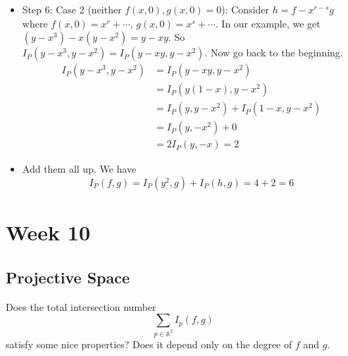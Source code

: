 \documentclass{report}
\begin{document}
\begin{examples}
\begin{example}
\begin{itemize}
                \item Step 6: Case 2 (neither $f(x, 0), g(x, 0) = 0$): Consider $h = f - x^{r - s}g$ where $f(x, 0) = x^{r} + \cdots $, $g(x, 0) = x^{s} + \cdots$. In our example, we get $(y - x^{3}) - x(y - x^{2}) = y - xy$. So $I_{P}(y - x^{3}, y - x^{2}) = I_{P}(y - xy, y - x^{2})$. Now go back to the beginning.
                    \begin{align*}
                        I_{P}(y - x^{3}, y - x^{2}) &= I_{P}(y - xy, y - x^{2})                      \\
                                                    &= I_{P}(y(1 - x), y - x^{2})                    \\
                                                    &= I_{P}(y, y - x^{2}) + I_{P}(1 - x, y - x^{2}) \\
                                                    &= I_{P}(y, -x^{2}) + 0                          \\
                                                    &=  2I_{P}(y, -x) = 2                              
                    \end{align*}

                \item Add them all up. We have
                    \begin{equation*}
                        I_{P}(f, g) = I_{P}(y^{2}, g) + I_{P}(h, g) = 4 + 2 = 6
                    \end{equation*}
            \end{itemize}
    \end{example}
\end{examples}

\chapter{Week 10}

\begin{topic}
    \section{Projective Space}
\end{topic}

Does the total intersection number 
    \begin{equation*}
        \sum_{p \in \mathbb{A}^{2}} I_{p}(f, g)
    \end{equation*}
satisfy some nice properties? Does it depend only on the degree of $f$ and $g$.
\end{document}

